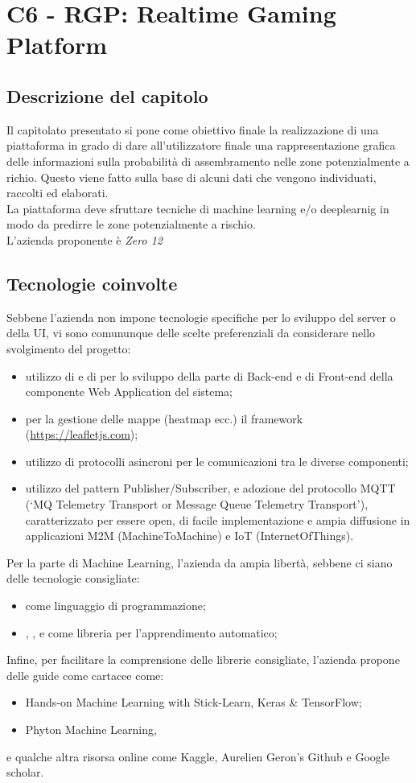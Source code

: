 \section{C6 - RGP: Realtime Gaming Platform}

\subsection{Descrizione del capitolo}
Il capitolato presentato si pone come obiettivo finale la realizzazione di una piattaforma in grado di dare all'utilizzatore finale una rappresentazione grafica delle informazioni sulla probabilità di assembramento nelle zone potenzialmente a richio. Questo viene fatto sulla base di alcuni dati che vengono individuati, raccolti ed elaborati. \\
La piattaforma deve sfruttare tecniche di machine learning e/o deeplearnig in modo da predirre le zone potenzialmente a rischio.\\
L'azienda proponente è \textit{Zero 12}

\subsection{Tecnologie coinvolte}
Sebbene l'azienda non impone tecnologie specifiche per lo sviluppo del server o della UI, vi sono comununque delle scelte preferenziali da considerare nello svolgimento del progetto:
\begin{itemize}
\item utilizzo di  e di  per lo sviluppo della parte di Back-end e di Front-end della componente Web Application del sistema;
\item per la gestione delle mappe (heatmap ecc.) il framework  (\url{https://leafletjs.com});
\item utilizzo di protocolli asincroni per le comunicazioni tra le diverse componenti;
\item utilizzo del pattern Publisher/Subscriber, e adozione del protocollo MQTT (‘MQ Telemetry Transport or Message Queue Telemetry Transport’), caratterizzato per essere open, di facile implementazione e ampia diffusione in applicazioni M2M (MachineToMachine) e IoT (InternetOfThings).
\end{itemize}
Per la parte di Machine Learning, l'azienda da ampia libertà, sebbene ci siano delle tecnologie consigliate:
\begin{itemize}
\item {} come linguaggio di programmazione;
\item {}, ,  e  come libreria per l'apprendimento automatico;
\end{itemize}
Infine, per facilitare la comprensione delle librerie consigliate, l'azienda propone delle guide come cartacee come:
\begin{itemize}
\item Hands-on Machine Learning with Stick-Learn, Keras \& TensorFlow;
\item Phyton Machine Learning,
\end{itemize}
e qualche altra risorsa online come Kaggle, Aurelien Geron's Github e Google scholar.

